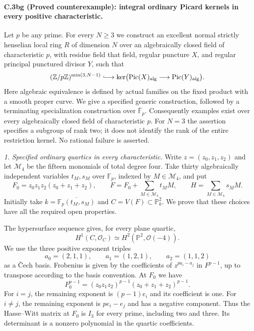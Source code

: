 \paragraph{C.3bg (Proved counterexample): integral ordinary Picard kernels in every positive characteristic.}
Let $p$ be any prime. For every $N\ge3$ we construct an excellent
normal strictly henselian local ring $R$ of dimension $N$ over an
algebraically closed field of characteristic $p$, with residue field
that field, regular puncture $X$, and regular principal punctured
divisor $Y$, such that
\[
 (\mathbb Z/p\mathbb Z)^{\min(3,N-1)}
 \lhook\joinrel\longrightarrow
 \ker\bigl(\operatorname{Pic}(X)_{\rm alg}
             \longrightarrow\operatorname{Pic}(Y)_{\rm alg}\bigr).
\]
Here algebraic equivalence is defined by actual families on the fixed
product with a smooth proper curve. We give a specified generic
construction, followed by a terminating specialization construction
over $\overline{\mathbb F}_p$. Consequently examples exist over every
algebraically closed field of characteristic $p$. For $N=3$ the
assertion specifies a subgroup of rank two; it does not identify the
rank of the entire restriction kernel. No rational failure is asserted.

\emph{1. Specified ordinary quartics in every characteristic.}
Write $z=(z_0,z_1,z_2)$ and let $\mathcal M_4$ be the fifteen monomials
of total degree four. Take thirty algebraically independent variables
$t_M,s_M$ over $\mathbb F_p$, indexed by $M\in\mathcal M_4$, and put
\[
 F_0=z_0z_1z_2(z_0+z_1+z_2),\qquad
 F=F_0+\sum_{M\in\mathcal M_4}t_M M,
 \qquad H=\sum_{M\in\mathcal M_4}s_M M.
\]
Initially take $k=\overline{\mathbb F_p(t_M,s_M)}$ and
$C=V(F)\subset\mathbb P^2_k$.
We prove that these choices have all the required open properties.

The hypersurface sequence gives, for every plane quartic,
\[
 H^1(C,\mathcal O_C)\simeq H^2(\mathbb P^2,\mathcal O(-4)).
\]
We use the three positive exponent triples
\[
 a_0=(2,1,1),\qquad a_1=(1,2,1),\qquad a_2=(1,1,2)
\]
as a \v{C}ech basis.
Frobenius is given by the coefficients of $z^{pa_i-a_j}$ in
$F^{p-1}$, up to transpose according to the basis convention.
At $F_0$ we have
\[
 F_0^{p-1}=(z_0z_1z_2)^{p-1}(z_0+z_1+z_2)^{p-1}.
\]
For $i=j$, the remaining exponent is $(p-1)e_i$ and its coefficient
is one. For $i\ne j$, the remaining exponent is $pe_i-e_j$ and has
a negative component. Thus the Hasse--Witt matrix at $F_0$ is $I_3$
for every prime, including two and three. Its determinant is a
nonzero polynomial in the quartic coefficients.

